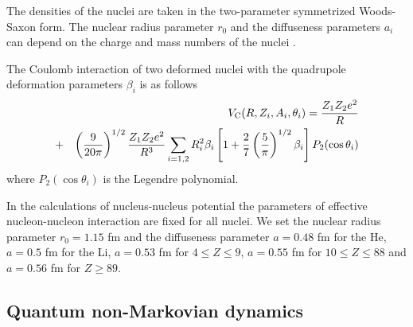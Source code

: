 \documentclass[preprint,review,12pt]{elsarticle}
\begin{document}
  The densities of the nuclei are taken in the two-parameter symmetrized Woods-Saxon form.
  The nuclear radius parameter $r_0$ and the diffuseness parameters $a_i$ can depend on the charge and mass
  numbers of the nuclei \cite{poten}.

  The Coulomb interaction of two deformed nuclei with the quadrupole deformation parameters $\beta_i$
  is as follows
  \begin{eqnarray}
  &&V_{\rm C}(R,Z_i, A_i,\theta_i)=\frac{Z_1 Z_2 e^2}{R}  \nonumber\\
  &+& 
  \left(\frac{9}{20 \pi}\right)^{1/2}\frac{Z_1 Z_2 e^2}{R^3}\sum_{i=1,2}R_i^2\beta_i\left[1+\frac{2}{7} \left(\frac{5}{\pi}\right)^{1/2} \beta_i\right] P_2(\cos\theta_i)
  \end{eqnarray}
  where $P_2(\cos\theta_i)$ is the Legendre polynomial.

  In the calculations of nucleus-nucleus potential the parameters of effective nucleon-nucleon interaction are fixed for all nuclei. We set the nuclear radius parameter $r_0=1.15$ fm and the diffuseness parameter $a=0.48$ fm for the He, $a=0.5$ fm for the Li, $a=0.53$ fm for $4\leq Z \leq 9$,
  $a=0.55$ fm for $10\leq Z \leq 88$ and $a=0.56$ fm for $Z \geq 89$.


\subsection{Quantum non-Markovian dynamics}
\end{document}

